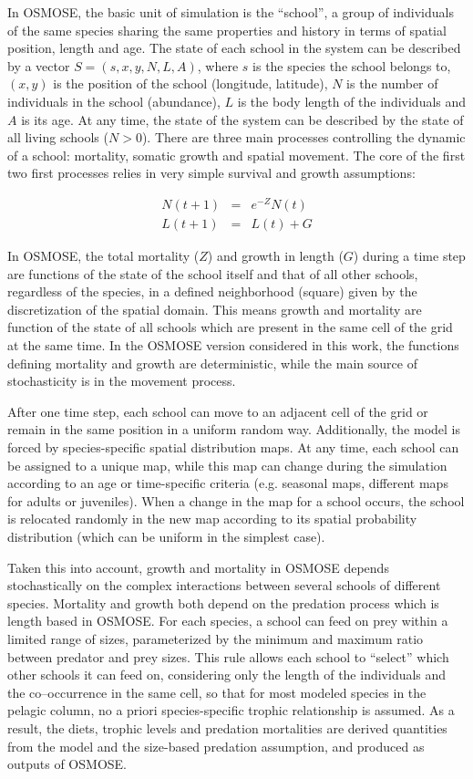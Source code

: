 \documentclass[10pt,a4paper]{article}
\begin{document}
In OSMOSE, the basic unit of simulation is the ``school'', a group of individuals of the same species sharing the same properties and history in terms of spatial position, length and age. The state of each school in the system can be described by a vector $S = (s, x, y, N, L, A)$, where $s$ is the species the school belongs to, $(x,y)$ is the position of the school (longitude, latitude), $N$ is the number of individuals in the school (abundance), $L$ is the body length of the individuals and $A$ is its age. At any time, the state of the system can be described by the state of all living schools  ($N>0$).
There are three main processes controlling the dynamic of a school: mortality, somatic growth and spatial movement. The core of the first two first processes relies in very simple survival and growth assumptions:

\begin{eqnarray}
N(t+1) & = & e^{-Z}N(t)\\
L(t+1) & = & L(t) + G
\end{eqnarray}


In OSMOSE, the total mortality ($Z$) and growth in length ($G$) during a time step are functions of the state of the school itself and that of all other schools, regardless of the species, in a defined neighborhood (square) given by the discretization of the spatial domain. This means growth and mortality are function of the state of all schools which are present in the same cell of the grid at the same time. In the OSMOSE version considered in this work, the functions defining mortality and growth are deterministic, while the main source of stochasticity is in the movement process. 

After one time step, each school can move to an adjacent cell of the grid or remain in the same position in a uniform random way. Additionally, the model is forced by species-specific spatial distribution maps. At any time, each school can be assigned to a unique map, while this map can change during the simulation according to an age or time-specific criteria (e.g. seasonal maps, different maps for adults or juveniles). When a change in the map for a school occurs, the school is relocated randomly in the new map according to its spatial probability distribution (which can be uniform in the simplest case).

Taken this into account, growth and mortality in OSMOSE depends stochastically on the complex interactions between several schools of different species.
Mortality and growth both depend on the predation process which is length based in OSMOSE. For each species, a school can feed on prey within a limited range of sizes, parameterized by the minimum and maximum ratio between predator and prey sizes. This rule allows each school to ``select'' which other schools it can feed on, considering only the length of the individuals and the co--occurrence in the same cell, so that for most modeled species in the pelagic column, no a priori species-specific trophic relationship is assumed. As a result, the diets, trophic levels and predation mortalities are derived quantities from the model and the size-based predation assumption, and produced as outputs of OSMOSE.
 
\end{document}
